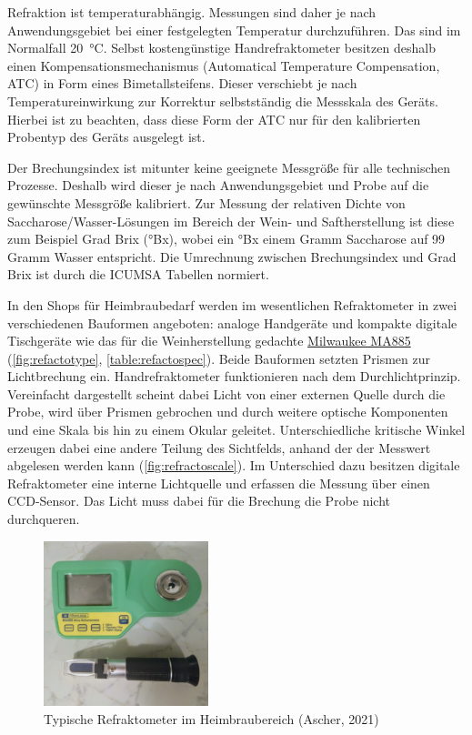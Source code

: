 \documentclass[a4paper,parskip=half]{scrartcl}
\begin{document}
Refraktion ist temperaturabhängig. Messungen sind daher je nach
Anwendungsgebiet bei einer festgelegten Temperatur durchzuführen.
Das sind im Normalfall 20~°C. Selbst kostengünstige Handrefraktometer
besitzen deshalb einen Kompensationsmechanismus (Automatical Temperature
Compensation, ATC) in Form eines Bimetallsteifens. Dieser 
verschiebt je nach Temperatureinwirkung zur Korrektur selbstständig
die Messskala des Geräts. Hierbei ist zu beachten, dass diese Form der
ATC nur für den kalibrierten Probentyp des Geräts ausgelegt ist.
\parencites{Depalma2017}{Distillique2020}{Gossett2012}[50]{Terrill2013}

Der Brechungsindex ist mitunter keine geeignete Messgröße für alle
technischen Prozesse. Deshalb wird dieser je nach Anwendungsgebiet
und Probe auf die gewünschte Messgröße kalibriert. Zur Messung
der relativen Dichte von Saccharose/Wasser-Lösungen im Bereich der
Wein- und Saftherstellung ist diese zum Beispiel Grad Brix (°Bx), wobei
ein °Bx einem Gramm Saccharose auf 99 Gramm Wasser entspricht.
\parencites[43]{Bonham2001}[50]{Terrill2013} Die Umrechnung zwischen
Brechungsindex und Grad Brix ist durch die ICUMSA
Tabellen normiert.

In den Shops für Heimbraubedarf werden im wesentlichen Refraktometer in
zwei verschiedenen Bauformen angeboten: analoge Handgeräte
und kompakte digitale Tischgeräte wie das für die Weinherstellung
gedachte \href{https://milwaukeeinstruments.eu/milwaukee-ma885-digital-brix-oechsle-oe-and-kmw-babo-refractometer/}{Milwaukee MA885} (\autoref{fig:refactotype},
\autoref{table:refactospec}). Beide Bauformen setzten Prismen zur
Lichtbrechung ein. Handrefraktometer funktionieren
nach dem Durchlichtprinzip. Vereinfacht dargestellt scheint dabei Licht
von einer externen Quelle durch die Probe, wird über Prismen gebrochen
und durch weitere optische Komponenten und eine Skala bis hin zu einem
Okular geleitet. Unterschiedliche kritische Winkel erzeugen dabei eine
andere Teilung des Sichtfelds, anhand der der Messwert abgelesen werden
kann (\autoref{fig:refractoscale}). Im Unterschied dazu besitzen
digitale Refraktometer eine interne Lichtquelle und erfassen die
Messung über einen CCD-Sensor. Das Licht muss dabei für die Brechung die Probe
nicht durchqueren. \parencites{AKRSSOGH2021}[102\psq]{Gamer1959}[50]{Terrill2013}
 
\begin{figure}[h]
\centering
\includegraphics[width=4.8cm]{images/types.jpg}
\caption{Typische Refraktometer im Heimbraubereich (Ascher, 2021)}
\label{fig:refactotype}
\end{figure}
\end{document}
